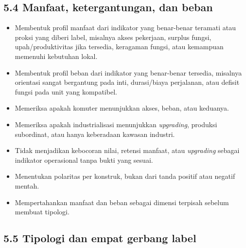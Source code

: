 \documentclass[
  indonesian,
  11pt,
]{article}
\providecommand{\tightlist}{%
  \setlength{\itemsep}{0pt}\setlength{\parskip}{0pt}}
\renewcommand{\tightlist}{%
  \setlength{\itemsep}{0.22em}%
  \setlength{\parskip}{0pt}%
}
\begin{document}
\subsection{5.4 Manfaat, ketergantungan, dan
beban}\label{manfaat-ketergantungan-dan-beban}

\begin{itemize}
\tightlist
\item[$\square$]
  Membentuk profil manfaat dari indikator yang benar-benar teramati atau
  proksi yang diberi label, misalnya akses pekerjaan, surplus fungsi,
  upah/produktivitas jika tersedia, keragaman fungsi, atau kemampuan
  memenuhi kebutuhan lokal.
\item[$\square$]
  Membentuk profil beban dari indikator yang benar-benar tersedia,
  misalnya orientasi sangat bergantung pada inti, durasi/biaya
  perjalanan, atau defisit fungsi pada unit yang kompatibel.
\item[$\square$]
  Memeriksa apakah komuter menunjukkan akses, beban, atau keduanya.
\item[$\square$]
  Memeriksa apakah industrialisasi menunjukkan \emph{upgrading},
  produksi subordinat, atau hanya keberadaan kawasan industri.
\item[$\square$]
  Tidak menjadikan kebocoran nilai, retensi manfaat, atau
  \emph{upgrading} sebagai indikator operasional tanpa bukti yang
  sesuai.
\item[$\square$]
  Menentukan polaritas per konstruk, bukan dari tanda positif atau
  negatif mentah.
\item[$\square$]
  Mempertahankan manfaat dan beban sebagai dimensi terpisah sebelum
  membuat tipologi.
\end{itemize}

\subsection{5.5 Tipologi dan empat gerbang
label}\label{tipologi-dan-empat-gerbang-label}
\end{document}
